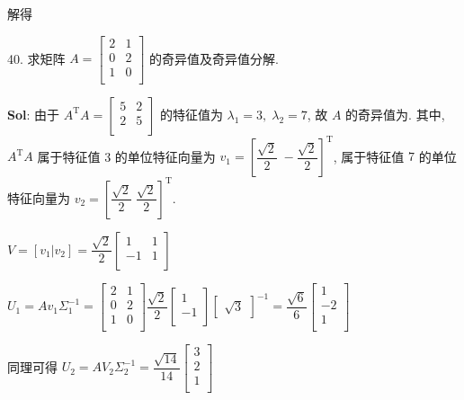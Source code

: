 解得 


\vspace{12pt}

40. 求矩阵 $A=\begin{bmatrix}
    2&1\\
    0&2\\
    1&0\\
\end{bmatrix}$ 的奇异值及奇异值分解.
 
\textbf{Sol}: 由于 $A^{\text{T}}A=\begin{bmatrix}
    5&2\\2&5\\
\end{bmatrix}$ 的特征值为 $\lambda_1=3,\;\lambda_2=7$, 故 $A$ 的奇异值为. 其中, $A^{\text{T}}A$ 属于特征值 3 的单位特征向量为 $v_1=[\dfrac{\sqrt{2}}{2}\;-\dfrac{\sqrt{2}}{2}]^{\text{T}}$, 属于特征值 $7$ 的单位特征向量为 $v_2=[\dfrac{\sqrt{2}}{2}\;\dfrac{\sqrt{2}}{2}]^{\text{T}}$.

$V=[v_1|v_2]=\dfrac{\sqrt{2}}{2}\begin{bmatrix}
    1&1\\-1&1\\
\end{bmatrix}$

$U_1=Av_1\Sigma_1^{-1}=\begin{bmatrix}
    2&1\\
    0&2\\
    1&0\\
\end{bmatrix}\dfrac{\sqrt{2}}{2}\begin{bmatrix}
    1\\-1\\
\end{bmatrix}\begin{bmatrix}
    \sqrt{3}
\end{bmatrix}^{-1}=\dfrac{\sqrt{6}}{6}\begin{bmatrix}
    1\\-2\\1\\
\end{bmatrix}$

同理可得
$U_2=AV_2\Sigma_2^{-1}=\dfrac{\sqrt{14}}{14}\begin{bmatrix}
    3\\2\\1\\
\end{bmatrix}$

